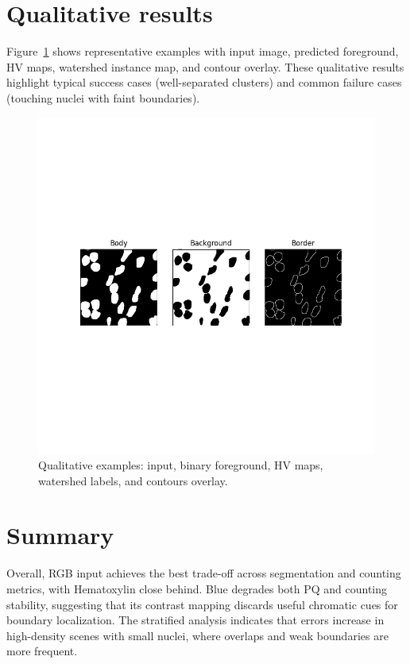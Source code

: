 \documentclass[target=bach,aauheader=,style=]{thud}
\begin{document}
\section{Qualitative results}
Figure~\ref{fig:qualitative} shows representative examples with input image, predicted foreground, HV maps, watershed instance map, and contour overlay. 
These qualitative results highlight typical success cases (well-separated clusters) and common failure cases (touching nuclei with faint boundaries).

\begin{figure}[ht]
    \centering
    \includegraphics[width=.98\linewidth]{imgs/3ch_binarymask.png}
    \caption{Qualitative examples: input, binary foreground, HV maps, watershed labels, and contours overlay.}
    \label{fig:qualitative}
\end{figure}

\section{Summary}
Overall, RGB input achieves the best trade-off across segmentation and counting metrics, with Hematoxylin close behind. 
Blue degrades both PQ and counting stability, suggesting that its contrast mapping discards useful chromatic cues for boundary localization. 
The stratified analysis indicates that errors increase in high-density scenes with small nuclei, where overlaps and weak boundaries are more frequent.
\end{document}
